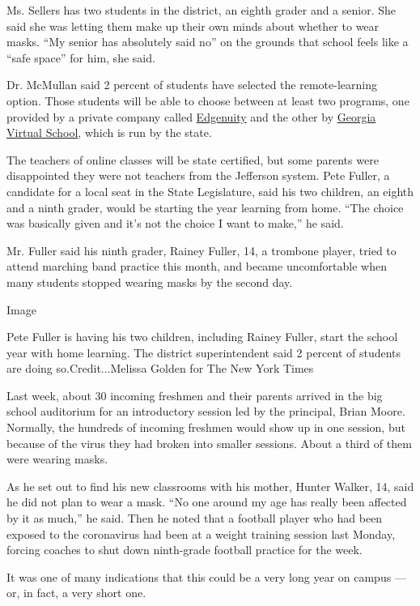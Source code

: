 Ms. Sellers has two students in the district, an eighth grader and a
senior. She said she was letting them make up their own minds about
whether to wear masks. ``My senior has absolutely said no'' on the
grounds that school feels like a ``safe space'' for him, she said.

Dr. McMullan said 2 percent of students have selected the
remote-learning option. Those students will be able to choose between at
least two programs, one provided by a private company called
\href{https://www.edgenuity.com/}{Edgenuity} and the other by
\href{https://www.gavirtualschool.org/}{Georgia Virtual School}, which
is run by the state.

The teachers of online classes will be state certified, but some parents
were disappointed they were not teachers from the Jefferson system. Pete
Fuller, a candidate for a local seat in the State Legislature, said his
two children, an eighth and a ninth grader, would be starting the year
learning from home. ``The choice was basically given and it's not the
choice I want to make,'' he said.

Mr. Fuller said his ninth grader, Rainey Fuller, 14, a trombone player,
tried to attend marching band practice this month, and became
uncomfortable when many students stopped wearing masks by the second
day.

Image

Pete Fuller is having his two children, including Rainey Fuller, start
the school year with home learning. The district superintendent said 2
percent of students are doing so.Credit...Melissa Golden for The New
York Times

Last week, about 30 incoming freshmen and their parents arrived in the
big school auditorium for an introductory session led by the principal,
Brian Moore. Normally, the hundreds of incoming freshmen would show up
in one session, but because of the virus they had broken into smaller
sessions. About a third of them were wearing masks.

As he set out to find his new classrooms with his mother, Hunter Walker,
14, said he did not plan to wear a mask. ``No one around my age has
really been affected by it as much,'' he said. Then he noted that a
football player who had been exposed to the coronavirus had been at a
weight training session last Monday, forcing coaches to shut down
ninth-grade football practice for the week.

It was one of many indications that this could be a very long year on
campus --- or, in fact, a very short one.

